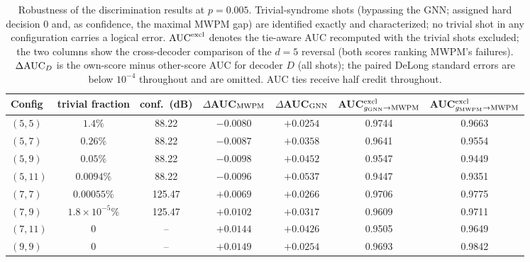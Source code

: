 \begin{table}
\centering
\begin{tabular}{l|cc|cc|cc}
\toprule
Config & trivial fraction & conf.\ (dB) & $\Delta$AUC$_{\rm MWPM}$ & $\Delta$AUC$_{\rm GNN}$ & AUC$^{\rm excl}_{g_{\rm GNN}\to{\rm MWPM}}$ & AUC$^{\rm excl}_{g_{\rm MWPM}\to{\rm MWPM}}$ \\
\hline
\midrule
$(5, 5)$ & $1.4\%$ & 88.22 & $-0.0080$ & $+0.0254$ & 0.9744 & 0.9663 \\
$(5, 7)$ & $0.26\%$ & 88.22 & $-0.0087$ & $+0.0358$ & 0.9641 & 0.9554 \\
$(5, 9)$ & $0.05\%$ & 88.22 & $-0.0098$ & $+0.0452$ & 0.9547 & 0.9449 \\
$(5, 11)$ & $0.0094\%$ & 88.22 & $-0.0096$ & $+0.0537$ & 0.9447 & 0.9351 \\
$(7, 7)$ & $0.00055\%$ & 125.47 & $+0.0069$ & $+0.0266$ & 0.9706 & 0.9775 \\
$(7, 9)$ & $1.8 \times 10^{-5}\%$ & 125.47 & $+0.0102$ & $+0.0317$ & 0.9609 & 0.9711 \\
$(7, 11)$ & $0$ & -- & $+0.0144$ & $+0.0426$ & 0.9505 & 0.9649 \\
$(9, 9)$ & $0$ & -- & $+0.0149$ & $+0.0254$ & 0.9693 & 0.9842 \\
\bottomrule
\end{tabular}
\caption{Robustness of the discrimination results at $p = 0.005$. Trivial-syndrome shots (bypassing the GNN; assigned hard decision $0$ and, as confidence, the maximal MWPM gap) are identified exactly and characterized; no trivial shot in any configuration carries a logical error. ${\rm AUC}^{\rm excl}$ denotes the tie-aware AUC recomputed with the trivial shots excluded; the two columns show the cross-decoder comparison of the $d = 5$ reversal (both scores ranking MWPM's failures). $\Delta{\rm AUC}_D$ is the own-score minus other-score AUC for decoder $D$ (all shots); the paired DeLong standard errors are below $10^{-4}$ throughout and are omitted. AUC ties receive half credit throughout.}
\label{robustness_table}
\end{table}
